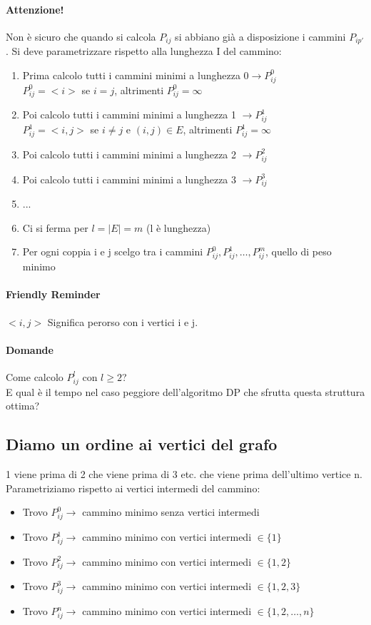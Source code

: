 \paragraph*{Attenzione!} Non è sicuro che quando si calcola $P_{ij}$ si abbiano già a disposizione
i cammini $P_{ip'}$.
Si deve parametrizzare rispetto alla lunghezza I del cammino:
\begin{enumerate}
    \item Prima calcolo tutti i cammini minimi a lunghezza $0 \rightarrow P^0_{ij}$\\
    $P^0_{ij} = <i>$ se $i = j$, altrimenti $P^0_{ij} = \infty$
    \item Poi calcolo tutti i cammini minimi a lunghezza 1 $\rightarrow P^1_{ij}$\\
    $P^1_{ij} = <i,j>$ se $i \neq j$ e $(i,j) \in E$, altrimenti $P^1_{ij} = \infty$
    \item Poi calcolo tutti i cammini minimi a lunghezza 2 $\rightarrow P^2_{ij}$
    \item Poi calcolo tutti i cammini minimi a lunghezza 3 $\rightarrow P^3_{ij}$
    \item ...
    \item Ci si ferma per $l = |E| = m$ (l è lunghezza)
    \item Per ogni coppia i e j scelgo tra i cammini $P^0_{ij}, P^1_{ij}, \dots, P^m_{ij}$,
    quello di peso minimo
\end{enumerate}
\paragraph*{Friendly Reminder} $<i,j>$ Significa perorso con i vertici i e j.
\paragraph*{Domande} Come calcolo $P^l_{ij}$ con $l \geq 2$?\\
E qual è il tempo nel caso peggiore dell'algoritmo DP che sfrutta questa struttura ottima?\\
\subsection{Diamo un ordine ai vertici del grafo}
1 viene prima di 2 che viene prima di 3 etc. che viene prima dell'ultimo vertice n.\\
Parametriziamo rispetto ai vertici intermedi del cammino:
\begin{itemize}
    \item Trovo $P^0_{ij} \rightarrow$ cammino minimo senza vertici intermedi
    \item Trovo $P^1_{ij} \rightarrow$ cammino minimo con vertici intermedi $\in \{1\}$
    \item Trovo $P^2_{ij} \rightarrow$ cammino minimo con vertici intermedi $\in \{1,2\}$
    \item Trovo $P^3_{ij} \rightarrow$ cammino minimo con vertici intermedi $\in \{1,2,3\}$
    \item Trovo $P^n_{ij} \rightarrow$ cammino minimo con vertici intermedi $\in \{1,2,\dots,n\}$
\end{itemize}
